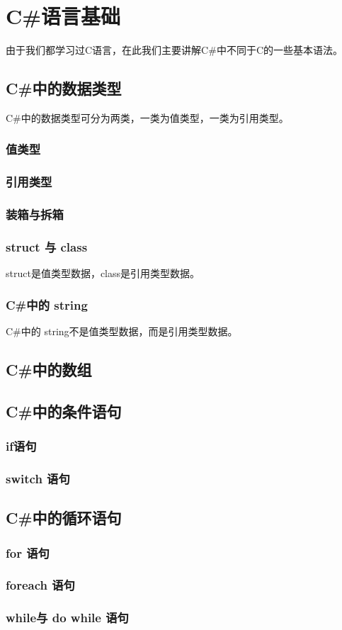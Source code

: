 ﻿%

\chapter{C\#语言基础}

由于我们都学习过C语言，在此我们主要讲解C\#中不同于C的一些基本语法。

\section{C\#中的数据类型}
C\#中的数据类型可分为两类，一类为值类型，一类为引用类型。

\subsection{值类型}

\subsection{引用类型}

\subsection{装箱与拆箱}

\subsection{struct 与 class}
struct是值类型数据，class是引用类型数据。

\subsection{ C\#中的 string }
C\#中的 string不是值类型数据，而是引用类型数据。

\section{C\#中的数组}

\section{C\#中的条件语句}
\subsection{ if语句 }

\subsection{ switch 语句 }

\section{C\#中的循环语句}
\subsection{ for 语句 }
\subsection{ foreach 语句 }
\subsection{ while与 do while 语句 }